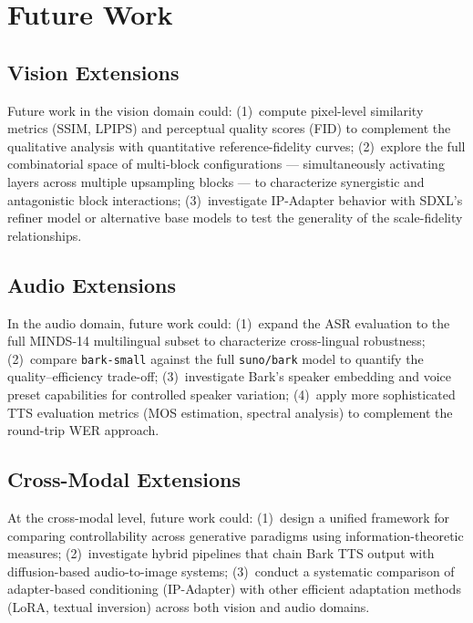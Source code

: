 \documentclass[conference]{IEEEtran}
\newcommand{\ipadapter}{IP-Adapter}
\newcommand{\sdxl}{SDXL}
\begin{document}
\section{Future Work}
\label{sec:futurework}

\subsection{Vision Extensions}

Future work in the vision domain could: (1)~compute pixel-level similarity metrics (SSIM, LPIPS) and perceptual quality scores (FID) to complement the qualitative analysis with quantitative reference-fidelity curves; (2)~explore the full combinatorial space of multi-block configurations --- simultaneously activating layers across multiple upsampling blocks --- to characterize synergistic and antagonistic block interactions; (3)~investigate \ipadapter{} behavior with \sdxl{}'s refiner model or alternative base models to test the generality of the scale-fidelity relationships.

\subsection{Audio Extensions}

In the audio domain, future work could: (1)~expand the ASR evaluation to the full MINDS-14 multilingual subset to characterize cross-lingual robustness; (2)~compare \texttt{bark-small} against the full \texttt{suno/bark} model to quantify the quality--efficiency trade-off; (3)~investigate Bark's speaker embedding and voice preset capabilities for controlled speaker variation; (4)~apply more sophisticated TTS evaluation metrics (MOS estimation, spectral analysis) to complement the round-trip WER approach.

\subsection{Cross-Modal Extensions}

At the cross-modal level, future work could: (1)~design a unified framework for comparing controllability across generative paradigms using information-theoretic measures; (2)~investigate hybrid pipelines that chain Bark TTS output with diffusion-based audio-to-image systems; (3)~conduct a systematic comparison of adapter-based conditioning (\ipadapter{}) with other efficient adaptation methods (LoRA, textual inversion) across both vision and audio domains.
\end{document}
